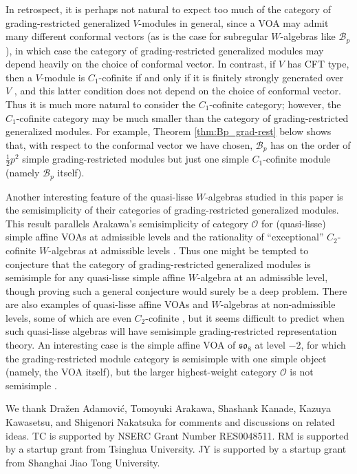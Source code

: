 \documentclass[11pt, reqno]{amsart}
\theoremstyle{definition}\newtheorem{defi}[thm]{Definition}
\theoremstyle{definition}\newtheorem{rem}[thm]{Remark}
\theoremstyle{definition}\newtheorem{exam}[thm]{Example}
\theoremstyle{definition}\newtheorem{assum}[thm]{Assumption}
\newcommand{\cB}{\mathcal{B}}
\newcommand{\cO}{\mathcal{O}}
\begin{document}
In retrospect, it is perhaps not natural to expect too much of the category of grading-restricted generalized $V$-modules in general, since a VOA may admit many different conformal vectors (as is the case for subregular $W$-algebras like $\cB_p$), in which case the category of grading-restricted generalized modules may depend heavily on the choice of conformal vector. In contrast, if $V$ has CFT type, then a $V$-module is $C_1$-cofinite if and only if it is finitely strongly generated over $V$ \cite[Lemma 3.1.6]{Ar-assoc-var}, and this latter condition does not depend on the choice of conformal vector. Thus it is much more natural to consider the $C_1$-cofinite category; however, the $C_1$-cofinite category may be much smaller than the category of grading-restricted generalized modules. For example, Theorem \ref{thm:Bp_grad-rest} below shows that, with respect to the conformal vector we have chosen, $\cB_p$ has on the order of $\frac{1}{2} p^2$ simple grading-restricted modules but just one simple $C_1$-cofinite module (namely $\cB_p$ itself).

Another interesting feature of the quasi-lisse $W$-algebras studied in this paper is the semisimplicity of their categories of grading-restricted generalized modules. This result parallels Arakawa's semisimplicity of category $\cO$ for (quasi-lisse) simple affine VOAs at admissible levels \cite{Ar-cat-O} and the rationality of ``exceptional'' $C_2$-cofinite $W$-algebras at admissible levels \cite{Ar-rat1, Ar-rat2, McR-rat}. Thus one might be tempted to conjecture that the category of grading-restricted generalized modules is semisimple for any quasi-lisse simple affine $W$-algebra at an admissible level, though proving such a general conjecture would surely be a deep problem. There are also examples of quasi-lisse affine VOAs and $W$-algebras at non-admissible levels, some of which are even $C_2$-cofinite \cite{Ka, AM1, AM2}, but it seems difficult to predict when such quasi-lisse algebras will have semisimple grading-restricted representation theory. An interesting case is the simple affine VOA of $\mathfrak{so}_8$ at level $-2$, for which the grading-restricted module category is semisimple with one simple object (namely, the VOA itself), but the larger highest-weight category $\cO$ is not semisimple \cite{KR2}.
\vspace{3mm}
 
 We thank Dra\v{z}en Adamovi\'{c}, Tomoyuki Arakawa, Shashank Kanade, Kazuya Kawasetsu, and Shigenori Nakatsuka for comments and discussions on related ideas. 
 TC is supported by  NSERC Grant Number RES0048511. RM is supported by a startup grant from Tsinghua University. JY is supported by a startup grant from Shanghai Jiao Tong University.
\end{document}
